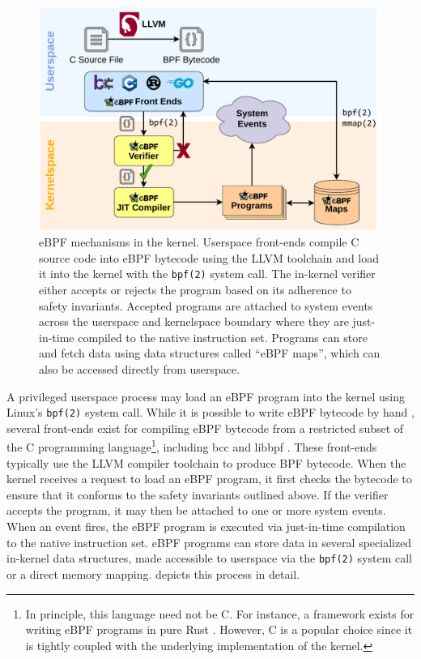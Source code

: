 \begin{figure}[htb]
  \centering
  \includegraphics[width=0.8\linewidth]{figs/ebpf.pdf}
  \caption{
    eBPF mechanisms in the kernel. Userspace front-ends compile C source code into eBPF bytecode using the LLVM toolchain and load it into the kernel with the \texttt{bpf(2)} system call. The in-kernel verifier either accepts or rejects the program based on its adherence to safety invariants. Accepted programs are attached to system events across the userspace and kernelspace boundary where they are just-in-time compiled to the native instruction set. Programs can store and fetch data using data structures called \enquote{eBPF maps}, which can also be accessed directly from userspace.
  }%
  \label{fig:ebpf}
\end{figure}

A privileged userspace process may load an eBPF program into the kernel using Linux's \texttt{bpf(2)} system call. While it is possible to write eBPF bytecode by hand \cite{gregg2019_bpf}, several front-ends exist for compiling eBPF bytecode from a restricted subset of the C programming language\footnote{In principle, this language need not be C. For instance, a framework exists for writing eBPF programs in pure Rust \cite{redbpf}. However, C is a popular choice since it is tightly coupled with the underlying implementation of the kernel.}, including bcc \cite{bcc} and libbpf \cite{libbpf}. These front-ends typically use the LLVM \cite{llvm_bpf} compiler toolchain to produce BPF bytecode. When the kernel receives a request to load an eBPF program, it first checks the bytecode to ensure that it conforms to the safety invariants outlined above. If the verifier accepts the program, it may then be attached to one or more system events. When an event fires, the eBPF program is executed via just-in-time compilation to the native instruction set. eBPF programs can store data in several specialized in-kernel data structures, made accessible to userspace via the \texttt{bpf(2)} system call or a direct memory mapping.  depicts this process in detail.


